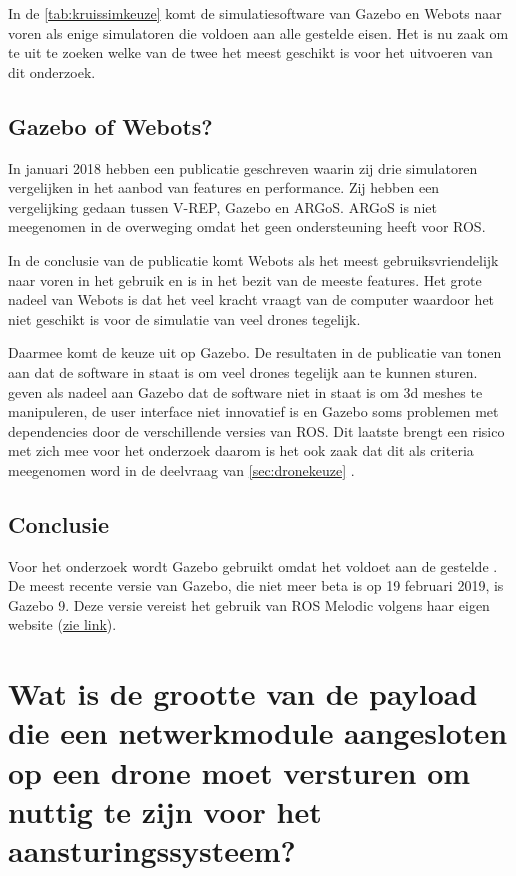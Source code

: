 \documentclass[a4paper, 11pt, oneside]{report}
\begin{document}
In de \autoref{tab:kruissimkeuze} komt de simulatiesoftware van Gazebo en Webots naar voren als enige simulatoren die voldoen aan alle gestelde eisen.
Het is nu zaak om te uit te zoeken welke van de twee het meest geschikt is voor het uitvoeren van dit onderzoek.

\subsection{Gazebo of Webots?}
In januari 2018 hebben \citeauthor{RobotCompare} een publicatie geschreven waarin zij drie simulatoren vergelijken in het aanbod van features en performance. 
Zij hebben een vergelijking gedaan tussen V-REP, Gazebo en ARGoS. 
ARGoS is niet meegenomen in de overweging omdat het geen ondersteuning heeft voor ROS.

In de conclusie van de publicatie komt Webots als het meest gebruiksvriendelijk naar voren in het gebruik en is in het bezit van de meeste features.
Het grote nadeel van Webots is dat het veel kracht vraagt van de computer waardoor het niet geschikt is voor de simulatie van veel drones tegelijk.

Daarmee komt de keuze uit op Gazebo. 
De resultaten in de publicatie van  tonen aan dat de software in staat is om veel drones tegelijk aan te kunnen sturen.
 geven als nadeel aan Gazebo dat de software niet in staat is om 3d meshes te manipuleren, de user interface niet innovatief is en Gazebo soms problemen met dependencies door de verschillende versies van ROS.
Dit laatste brengt een risico met zich mee voor het onderzoek daarom is het ook zaak dat dit als criteria meegenomen word in de deelvraag van \autoref{sec:dronekeuze} . 

\subsection{Conclusie}
Voor het onderzoek wordt Gazebo gebruikt omdat het voldoet aan de gestelde .
De meest recente versie van Gazebo, die niet meer beta is op 19 februari 2019, is Gazebo 9.
Deze versie vereist het gebruik van ROS Melodic volgens haar eigen website  (\href{http://gazebosim.org/tutorials?tut=ros_wrapper_versions}{zie link}).

\section[Welke grootte voor de payload?]{Wat is de grootte van de payload die een netwerkmodule aangesloten op een drone moet versturen om nuttig te zijn voor het aansturingssysteem?}
\end{document}
